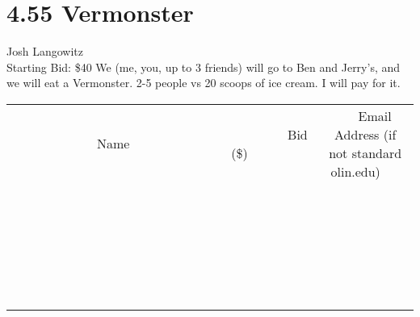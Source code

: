 \documentclass[11pt]{article}
\begin{document}
\section*{4.55 Vermonster}
Josh Langowitz
\\
Starting Bid: \$40
\newline
We (me, you, up to 3 friends) will go to Ben and Jerry's, and we will eat a Vermonster. 2-5 people vs 20 scoops of ice cream. I will pay for it.
\\[6ex]
\begin{tabular}{c c c}
~~~~~~~~~~~~~Name~~~~~~~~~~~~~ & ~~~~~~~~~Bid (\$)~~~~~~~~~  & ~~~Email Address (if not standard olin.edu)~~~\\
 & & \\
\hline
 & & \\
\hline
 & & \\
\hline
 & & \\
\hline
 & & \\
\hline
 & & \\
\hline
 & & \\
\hline
 & & \\
\hline
 & & \\
\hline
 & & \\
\hline
 & & \\
\hline
 & & \\
\hline
 & & \\
\hline
 & & \\
\hline
 & & \\
\hline
 & & \\
\hline
 & & \\
\hline
 & & \\
\hline
 & & \\
\hline
 & & \\
\hline
 & & \\
\hline
 & & \\
\hline
 & & \\
\hline
 & & \\
\hline
 & & \\
\hline
 & & \\
\hline
\end{tabular}
\newpage
\end{document}
